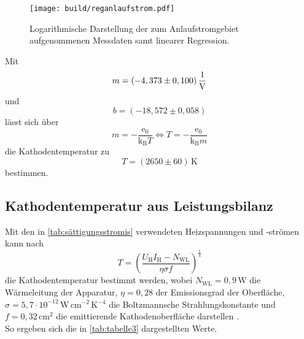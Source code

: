 \begin{figure}
    \centering
    \texttt{[image: build/reganlaufstrom.pdf]}
    \caption{Logarithmische Darstellung der zum Anlaufstromgebiet aufgenommenen Messdaten samt linearer Regression.}
    \label{fig:anlaufstrom}
\end{figure}

Mit
\begin{equation*}
    m = (-4,373 \pm 0,100) \, \unit{\dfrac{1}{\volt}}
\end{equation*}
und
\begin{equation*}
    b = (-18,572 \pm 0,058) 
\end{equation*}
lässt sich über
\begin{equation*}
    m = -\dfrac{\text{e}_0}{\text{k}_\text{B} T} \Leftrightarrow T = - \dfrac{\text{e}_0}{\text{k}_\text{B} m}
\end{equation*}
die Kathodentemperatur zu
\begin{equation*}
    T = (2650 \pm 60) \,\unit{\kelvin}
\end{equation*}
bestimmen. 


\subsection{Kathodentemperatur aus Leistungsbilanz}

Mit den in \autoref{tab:sättigungsstromis} verwendeten Heizspannungen und -strömen kann nach
\begin{equation*}
    T = \left(\dfrac{U_\text{H} I_\text{H} - N_\text{WL}}{\eta \sigma f}\right)^\frac{1}{4}
\end{equation*}
die Kathodentemperatur bestimmt werden, wobei $N_\text{WL} = 0,9 \,\unit{\watt}$ die Wärmeleitung der Apparatur, $\eta = 0,28$ der Emissionsgrad der Oberfläche,
$\sigma = 5,7 \cdot 10^{-12} \,\unit{\watt \,\centi\meter^{-2} \,\kelvin^{-4}}$ die Boltzmannsche Strahlungskonstante und $f = 0,32 \,\unit{\centi\meter^2}$ die emittierende Kathodenoberfläche darstellen \cite{ap09}. \\

So ergeben sich die in \autoref{tab:tabelle3} dargestellten Werte.

%

